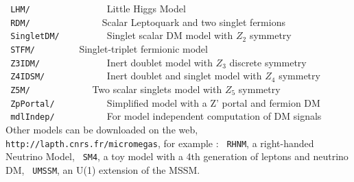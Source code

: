 \documentclass[12pt,a4paper]{article}
\begin{document}
\verb| LHM/               |         Little Higgs Model\cite{Belyaev:2006jh} \\
\verb| RDM/              |  Scalar Leptoquark and two singlet fermions\cite{Belanger:2021smw} \\
\verb| SingletDM/         | Singlet scalar DM model with $Z_2$ symmetry \cite{McDonald:2001vt} \\ 
\verb| STFM/         |Singlet-triplet fermionic model \\ 
\verb| Z3IDM/             |        Inert doublet model  with $Z_3$ discrete
symmetry \cite{Belanger:2012vp,Belanger:2014bga} \\
\verb| Z4IDSM/            |         Inert doublet and singlet model with $Z_4$
symmetry \cite{Belanger:2012vp,Belanger:2014bga} \\  
\verb| Z5M/            |       Two scalar singlets model with $Z_5$
symmetry \cite{Belanger:2020hyh} \\  
\verb| ZpPortal/          | Simplified model with a Z' portal  and fermion DM  \\ 
\verb| mdlIndep/          |           For model independent computation of DM signals                                 \\

Other models can be downloaded on the  web,  \verb|http://lapth.cnrs.fr/micromegas|, for example :
\verb| RHNM|, a right-handed Neutrino Model\cite{Belanger:2007dx},          
\verb| SM4|, a toy model with a 4th generation of leptons and neutrino DM, 
\verb| UMSSM|, an   U(1) extension of the MSSM\cite{DaSilva:2013jga,Belanger:2015cra}.
\end{document}

